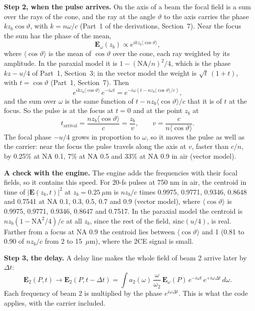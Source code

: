 \documentclass[11pt]{article}
\begin{document}
\textbf{Step 2, when the pulse arrives.} On the axis of a beam the focal field is a sum over the rays of the cone,
and the ray at the angle $\vartheta$ to the axis carries the phase $kz_b\cos\vartheta$, with $k = n\omega/c$ (Part~1 of
the derivations, Section~7). Near the focus the sum has the phase of the mean,
\begin{equation}\mathbf{E}_\omega(z_b) \propto e^{ikz_b\langle\cos\vartheta\rangle} ,\end{equation}
where $\langle\cos\vartheta\rangle$ is the mean of $\cos\vartheta$ over the cone, each ray weighted by its amplitude. In
the paraxial model it is $1 - (\mathrm{NA}/n)^2/4$, which is the phase $kz - u/4$ of Part~1, Section~3; in the vector
model the weight is $\sqrt t\,(1 + t)$, with $t = \cos\vartheta$ (Part~1, Section~7). Then
\begin{equation}e^{ikz_b\langle\cos\vartheta\rangle}\,e^{-i\omega t} = e^{-i\omega(t - nz_b\langle\cos\vartheta\rangle/c)} ,\end{equation}
and the sum over $\omega$ is the same function of $t - nz_b\langle\cos\vartheta\rangle/c$ that it is of $t$ at the
focus. So the pulse is at the focus at $t = 0$ and at the point $z_b$ at
\begin{equation}t_{\text{arrival}} = \frac{n z_b\langle\cos\vartheta\rangle}{c} = \frac{z_b}{v},\qquad
v = \frac{c}{n\langle\cos\vartheta\rangle} .\label{eq:arr}\end{equation}
The focal phase $-u/4$ grows in proportion to $\omega$, so it moves the pulse as well as the carrier: near the focus
the pulse travels along the axis at $v$, faster than $c/n$, by 0.25\% at NA 0.1, 7\% at NA 0.5 and 33\% at NA 0.9 in
air (vector model).

\textbf{A check with the engine.} The engine adds the frequencies with their focal fields, so it contains this speed.
For 20-fs pulses at 750 nm in air, the centroid in time of $|\mathbf{E}(z_b,t)|^2$ at $z_b = 0.25\ \mu$m is $nz_b/c$
times 0.9975, 0.9771, 0.9346, 0.8648 and 0.7541 at NA 0.1, 0.3, 0.5, 0.7 and 0.9 (vector model), where
$\langle\cos\vartheta\rangle$ is 0.9975, 0.9771, 0.9346, 0.8647 and 0.7517. In the paraxial model the centroid is
$nz_b(1 - \mathrm{NA}^2/4)/c$ at all $z_b$, since the rest of the field, $\mathrm{sinc}(u/4)$, is real. Farther from a
focus at NA 0.9 the centroid lies between $\langle\cos\vartheta\rangle$ and 1 (0.81 to 0.90 of $nz_b/c$ from 2 to
15~$\mu$m), where the 2CE signal is small.

\textbf{Step 3, the delay.} A delay line makes the whole field of beam 2 arrive later by $\Delta t$:
\begin{equation}\mathbf{E}_2(P,t) \longrightarrow \mathbf{E}_2(P,t-\Delta t)
= \int a_2(\omega)\,\frac{\omega}{\omega_2}\,\mathbf{E}_\omega(P)\,e^{-i\omega t}\,e^{+i\omega\Delta t}\,d\omega .\label{eq:delay}\end{equation}
Each frequency of beam 2 is multiplied by the phase $e^{i\omega\Delta t}$. This is what the code applies, with the
carrier included.
\end{document}
